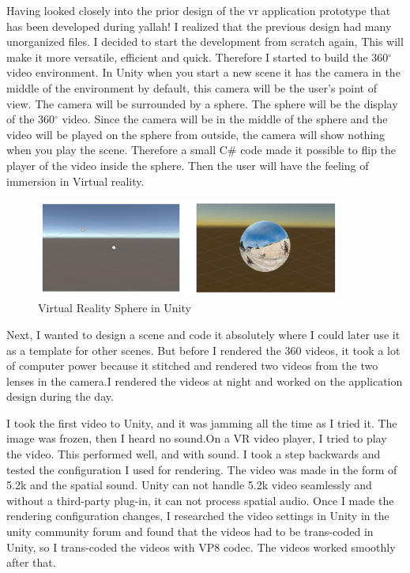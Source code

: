  Having looked closely into the prior design of the \acrshort{vr} application prototype that has been developed during \acrshort{yallah!} I realized that the previous design had many unorganized files. I decided to start the development from scratch again, This will make it more versatile, efficient and quick. Therefore I started to build the 360$^{\circ}$ video environment. In Unity when you start a new scene it has the camera in the middle of the environment by default, this camera will be the user's point of view. The camera will be surrounded by a sphere. The sphere will be the display of the 360$^{\circ}$ video. Since the camera will be in the middle of the sphere and the video will be played on the sphere from outside, the camera will show nothing when you play the scene. Therefore a small C\# code made it possible to flip the player of the video inside the sphere. Then the user will have the feeling of immersion in Virtual reality. 
\begin{figure}[ht]
    \centering
    \includegraphics[width=0.90\textwidth]{images/sphere.png}
    \caption{Virtual Reality Sphere in Unity }
    \label{fig:sphere}
\end{figure}


Next, I wanted to design a scene and code it absolutely where I could later use it as a template for other scenes. But before I rendered the 360 videos, it took a lot of computer power because it stitched and rendered two videos from the two lenses in the camera.I rendered the videos at night and worked on the application design during the day.

I took the first video to Unity, and it was jamming all the time as I tried it. The image was frozen, then I heard no sound.On a VR video player, I tried to play the video. This performed well, and with sound. I took a step backwards and tested the configuration I used for rendering. The video was made in the form of 5.2k and the spatial sound. Unity can not handle 5.2k video seamlessly and without a third-party plug-in, it can not process spatial audio. Once I made the rendering configuration changes, I researched the video settings in Unity in the unity community forum and found that the videos had to be trans-coded in Unity, so I trans-coded the videos with VP8 codec. The videos worked smoothly after that. 

